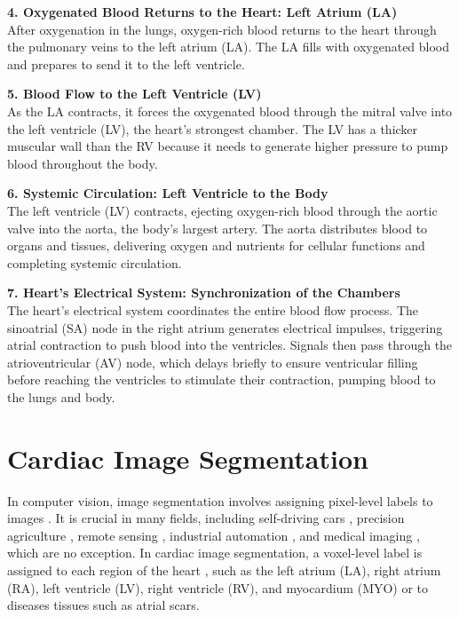 \noindent\textbf{4. Oxygenated Blood Returns to the Heart: Left Atrium (LA)}\\
After oxygenation in the lungs, oxygen-rich blood returns to the heart through the pulmonary veins to the left atrium (LA). The LA fills with oxygenated blood and prepares to send it to the left ventricle.

\noindent\textbf{5. Blood Flow to the Left Ventricle (LV)}\\
As the LA contracts, it forces the oxygenated blood through the mitral valve into the left ventricle (LV), the heart's strongest chamber. The LV has a thicker muscular wall than the RV because it needs to generate higher pressure to pump blood throughout the body.

\noindent\textbf{6. Systemic Circulation: Left Ventricle to the Body}\\
The left ventricle (LV) contracts, ejecting oxygen-rich blood through the aortic valve into the aorta, the body's largest artery. The aorta distributes blood to organs and tissues, delivering oxygen and nutrients for cellular functions and completing systemic circulation.

\noindent\textbf{7. Heart's Electrical System: Synchronization of the Chambers}\\
The heart's electrical system coordinates the entire blood flow process.
The sinoatrial (SA) node in the right atrium generates electrical impulses, triggering atrial contraction to push blood into the ventricles. Signals then pass through the atrioventricular (AV) node, which delays briefly to ensure ventricular filling before reaching the ventricles to stimulate their contraction, pumping blood to the lungs and body.
\section{Cardiac Image Segmentation}
In computer vision, image segmentation involves assigning pixel-level labels to images \cite{pal1993review}. It is crucial in many fields, including self-driving cars \cite{sellat2022semantic}, precision agriculture \cite{khan2020ced}, remote sensing \cite{yuan2021review}, industrial automation \cite{dirr2024cut}, and medical imaging \cite{azad2024medical}, which are no exception. In cardiac image segmentation, a voxel-level label is assigned to each region of the heart \cite{chen2020deep}, such as the left atrium (LA), right atrium (RA), left ventricle (LV), right ventricle (RV), and myocardium (MYO) or to diseases tissues such as atrial scars.

